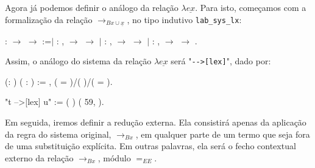 \bigskip

Agora já podemos definir o análogo da relação $\lambda \underline{ex}$.
Para isto, começamos com a formalização da relação $\rightarrow_{Bx \cup
    \underline{x}}$, no tipo indutivo \texttt{lab\_sys\_lx}:

\bigskip

\coqdocnoindent {} : 
\ensuremath{\rightarrow}  \ensuremath{\rightarrow}
 :=\coqdoceol \coqdocnoindent \ensuremath{|}  :
\coqdockw{\ensuremath{\forall}}  , 
\ensuremath{\rightarrow}  \ensuremath{\rightarrow}
  \coqdoceol \coqdocnoindent
\ensuremath{|}  : \coqdockw{\ensuremath{\forall}}
 , 
\ensuremath{\rightarrow}  \ensuremath{\rightarrow}
  \coqdoceol \coqdocnoindent
\ensuremath{|}  : \coqdockw{\ensuremath{\forall}}
 , 
\ensuremath{\rightarrow} 
\ensuremath{\rightarrow}  
.\coqdoceol \coqdocemptyline

\bigskip

Assim, o análogo do sistema da relação $\lambda \underline{ex}$ será
"\texttt{-{}->[lex]}", dado por:

\bigskip

\coqdocnoindent {}  (:
) ( : ) := \coqdoceol
\coqdocindent{2.00em} \coqdoctac{\ensuremath{\exists}} 
, ( =
)/(
 
)/( =
).\coqdoceol \coqdocemptyline

\coqdocnoindent
{} "t -->[lex] u" := (  ) (  59,  ).\coqdoceol

\bigskip

Em seguida, iremos definir a redução externa. Ela consistirá apenas da aplicação
da regra do sistema original, $\rightarrow_{Bx}$, em qualquer parte de um termo
que seja fora de uma substituição explícita. Em outras palavras, ela será o
fecho contextual externo da relação $\rightarrow_{Bx}$, módulo $=_{EE}$.

